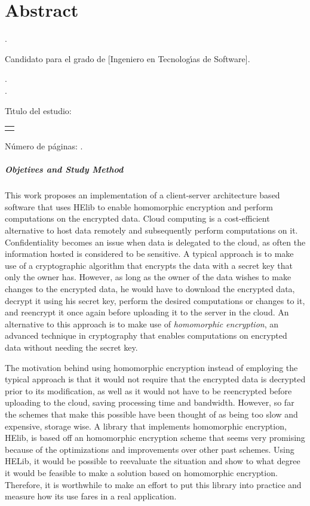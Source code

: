 \chapter{Abstract}

\noindent\autor.

\noindent Candidato para el grado de [Ingeniero en Tecnolog\'{\i}as de Software].

\noindent\uanl.\\
\noindent\fime.

\noindent T\'{\i}tulo del estudio: 

\begin{center}
\begin{tabular}{p{11cm}}
	\centering
	\scshape{\large{\titulo}}
\end{tabular}
\end{center}\bigskip

\noindent N\'{u}mero de p\'{a}ginas: \pageref*{lastpage}.

\paragraph{Objetives and Study Method}
This work proposes an implementation of a client-server architecture based software that uses HElib to enable homomorphic encryption and perform computations on the encrypted data. Cloud computing is a cost-efficient alternative to host data remotely and subsequently perform computations on it. Confidentiality becomes an issue when data is delegated to the cloud, as often the information hosted is considered to be sensitive. A typical approach is to make use of a cryptographic algorithm that encrypts the data with a secret key that only the owner has. However, as long as the owner of the data wishes to make changes to the encrypted data, he would have to download the encrypted data, decrypt it using his secret key, perform the desired computations or changes to it, and reencrypt it once again before uploading it to the server in the cloud. An alternative to this approach is to make use of \emph{homomorphic encryption}, an advanced technique in cryptography that enables computations on encrypted data without needing the secret key. 

The motivation behind using homomorphic encryption instead of employing the typical approach is that it would not require that the encrypted data is decrypted prior to its modification, as well as it would not have to be reencrypted before uploading to the cloud, saving processing time and bandwidth. However, so far the schemes that make this possible have been thought of as being too slow and expensive, storage wise. A library that implements homomorphic encryption, HElib, is based off an homomorphic encryption scheme that seems very promising because of the optimizations and improvements over other past schemes. Using HELib, it would be possible to reevaluate the situation and show to what degree it would be feasible to make a solution based on homomorphic encryption. Therefore, it is worthwhile to make an effort to put this library into practice and measure how its use fares in a real application.

